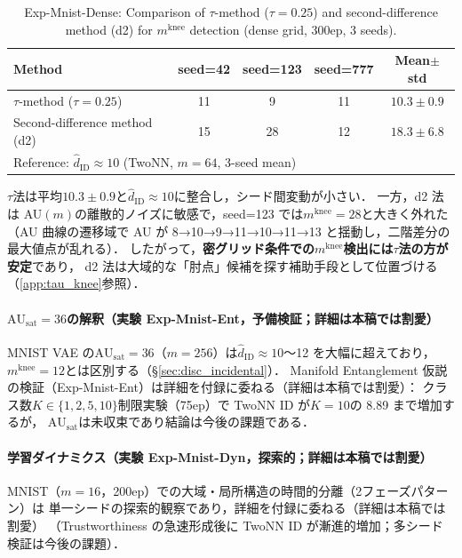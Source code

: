 \documentclass[11pt,a4paper]{jsarticle}
\newcommand{\AUsat}{\mathrm{AU}_{\mathrm{sat}}}
\newcommand{\mknee}{m^{\mathrm{knee}}}
\begin{document}
\begin{table}[H]
\centering
\caption{Exp-Mnist-Dense: Comparison of $\tau$-method ($\tau=0.25$) and second-difference method (d2) for $\mknee$ detection (dense grid, 300ep, 3 seeds).}
\label{tab:el_knee_compare}
\small
\begin{tabular}{lcccc}
\toprule
Method & seed=42 & seed=123 & seed=777 & Mean$\pm$std \\
\midrule
$\tau$-method ($\tau=0.25$) & 11 & 9  & 11 & $10.3 \pm 0.9$ \\
Second-difference method (d2) & 15 & 28 & 12 & $18.3 \pm 6.8$ \\
\midrule
\multicolumn{5}{l}{Reference: $\hat{d}_\mathrm{ID} \approx 10$ (TwoNN, $m=64$, 3-seed mean)} \\
\bottomrule
\end{tabular}
\end{table}

$\tau$法は平均$10.3 \pm 0.9$と$\hat{d}_\mathrm{ID} \approx 10$に整合し，シード間変動が小さい．
一方，d2 法は AU$(m)$の離散的ノイズに敏感で，seed=123 では$\mknee = 28$と大きく外れた
（AU 曲線の遷移域で AU が 8→10→9→11→10→11→13 と揺動し，二階差分の最大値点が乱れる）．
したがって，\textbf{密グリッド条件での$\mknee$検出には$\tau$法の方が安定}であり，
d2 法は大域的な「肘点」候補を探す補助手段として位置づける（\ref{app:tau_knee}参照）．

\paragraph{$\AUsat = 36$の解釈（実験 Exp-Mnist-Ent，予備検証；詳細は本稿では割愛）}
MNIST VAE の$\AUsat = 36$（$m=256$）は$\hat{d}_\mathrm{ID} \approx 10$〜12 を大幅に超えており，
$\mknee = 12$とは区別する（§\ref{sec:disc_incidental}）．
Manifold Entanglement 仮説の検証（Exp-Mnist-Ent）は詳細を付録に委ねる（詳細は本稿では割愛）：
クラス数$K \in \{1,2,5,10\}$制限実験（75ep）で TwoNN ID が$K=10$の 8.89 まで増加するが，
$\AUsat$は未収束であり結論は今後の課題である．

\paragraph{学習ダイナミクス（実験 Exp-Mnist-Dyn，探索的；詳細は本稿では割愛）}
MNIST（$m=16$，200ep）での大域・局所構造の時間的分離（2フェーズパターン）は
単一シードの探索的観察であり，詳細を付録に委ねる（詳細は本稿では割愛）
（Trustworthiness の急速形成後に TwoNN ID が漸進的増加；多シード検証は今後の課題）．
\end{document}
